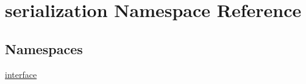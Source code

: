 \hypertarget{namespaceserialization}{}\section{serialization Namespace Reference}
\label{namespaceserialization}
\subsection*{Namespaces}
\begin{DoxyCompactItemize}
\item 
 \hyperlink{namespaceserialization_1_1interface}{interface}
\end{DoxyCompactItemize}
